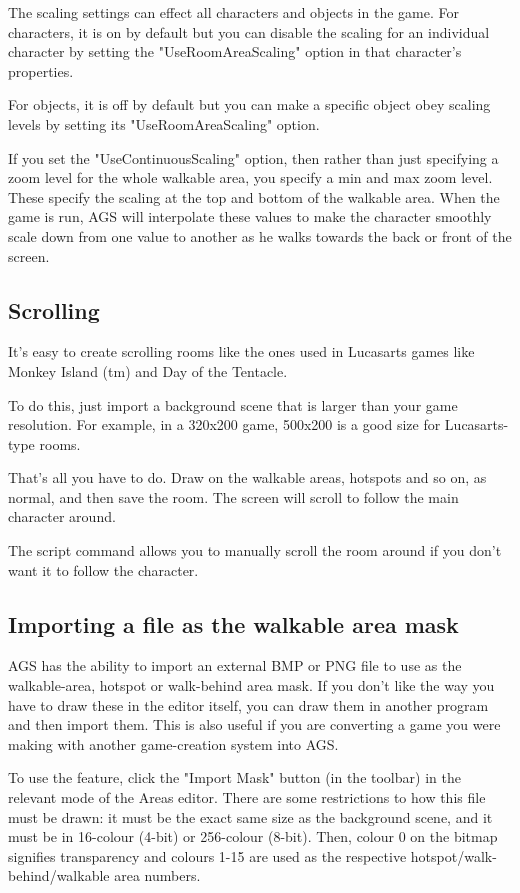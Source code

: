 The scaling settings can effect all characters and objects in the game. For characters,
it is on by default but you can disable the scaling for an individual character by
setting the "UseRoomAreaScaling" option in that character's properties.

For objects, it is off by default but you can make a specific object obey scaling
levels by setting its "UseRoomAreaScaling" option.

If you set the "UseContinuousScaling" option, then rather than just specifying a
zoom level for the whole walkable area, you specify a min and max zoom level. These
specify the scaling at the top and bottom of the walkable area. When the game is run,
AGS will interpolate these values to make the character smoothly scale down from
one value to another as he walks towards the back or front of the screen.

\subsection{Scrolling}%

It's easy to create scrolling rooms like the ones used in Lucasarts games
like Monkey Island (tm) and Day of the Tentacle.

To do this, just import a background scene that is larger than your game resolution.
For example, in a 320x200 game, 500x200 is a good size for Lucasarts-type rooms.

That's all you have to do. Draw on the walkable areas, hotspots and so on, as
normal, and then save the room. The screen will scroll to follow the main character
around.

The script command  allows you to manually scroll
the room around if you don't want it to follow the character.


\subsection{Importing a file as the walkable area mask}%

AGS has the ability to import an external BMP or PNG file to use as the
walkable-area, hotspot or walk-behind area mask. If you don't like the way
you have to draw these in the editor itself, you can draw them in another
program and then import them. This is also useful if you are converting a
game you were making with another game-creation system into AGS.

To use the feature, click the "Import Mask" button (in the toolbar) in the
relevant mode of the Areas editor. There are some restrictions to how this
file must be drawn: it must be the exact same size as the background scene,
and it must be in 16-colour (4-bit) or 256-colour (8-bit). Then, colour 0
on the bitmap signifies transparency and colours 1-15 are used as the
respective hotspot/walk-behind/walkable area numbers.

